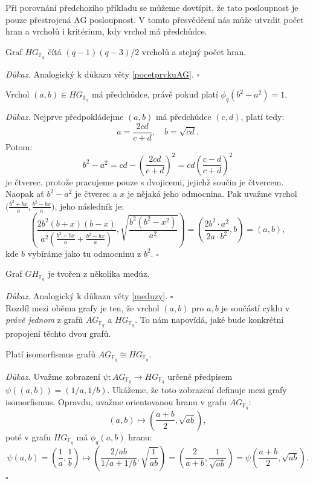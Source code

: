 \documentclass[12pt]{report}
\begin{document}
Při porovnání předchozího příkladu se můžeme dovtípit, že tato posloupnost je pouze přestrojená AG posloupnost. V tomto přesvědčení nás může utvrdit počet hran a vrcholů i kritérium, kdy vrchol má předchůdce.

\begin{veta}
Graf $HG_{\mathbb{F}_q}$ čítá $(q-1)(q-3)/2$ vrcholů a stejný počet hran.
\end{veta}
\textit{Důkaz.} Analogický k důkazu věty \ref{pocetprvkuAG}. \hfill $\square$


\begin{lemma}
Vrchol $(a,b) \in HG_{\mathbb{F}_q}$ má předchůdce, právě pokud platí $\phi_q(b^2-a^2)=1$.
\end{lemma}

\noindent \textit{Důkaz.} Nejprve předpokládejme $(a,b)$ má předchůdce $(c,d)$, platí tedy:
\begin{equation*}
a = \frac{2cd}{c+d}, \quad b = \sqrt{cd}.
\end{equation*}
Potom:
\begin{equation*}
b^2-a^2 = cd- \left(\frac{2 cd}{c+d} \right)^2 = cd \left( \frac{c-d}{c+d} \right)^2
\end{equation*}
je čtverec, protože pracujeme pouze s dvojicemi, jejichž součin je čtvercem. Naopak ať $b^2-a^2$ je čtverec a $x$ je nějaká jeho odmocnina. Pak uvažme vrchol $\Big(\frac{b^2+b  x}{a},\frac{b^2-bx}{a} \Big)$, jeho následník je: $$\left(\frac{2 b^2 (b+x)(b-x)}{a^2 \left(\frac{b^2+bx}{a} + \frac{b^2-bx}{a} \right)}, \sqrt{\frac{b^2(b^2-x^2)}{a^2}} \right)= \left(\frac{2 b^2 \cdot a^2}{2 a \cdot b^2 }, b \right) = \left(a, b \right),$$
kde $b$ vybíráme jako tu  odmocninu z $b^2$. \hfill $\square$

\begin{dusledek}
Graf $GH_{\mathbb{F}_q}$ je tvořen z několika medúz.
\end{dusledek}
\noindent \textit{Důkaz}. Analogický k důkazu věty \ref{meduzy}. \hfill $\square$\\

Rozdíl mezi oběma grafy je ten, že vrchol $(a,b)$ pro $a,b$ je součástí cyklu v \textit{právě jednom} z grafů $AG_{\mathbb{F}_q}$ a $HG_{\mathbb{F}_q}$. To nám napovídá, jaké bude konkrétní propojení těchto dvou grafů.

\begin{veta}
Platí isomorfismus grafů $AG_{\mathbb{F}_q} \cong HG_{\mathbb{F}_q}$.
\end{veta}
\noindent \textit{Důkaz.} Uvažme zobrazení $\psi : AG_{\mathbb{F}_q} \longrightarrow HG_{\mathbb{F}_q}$ určené předpisem $\psi((a,b)) = (1/a,1/b)$. Ukážeme, že toto zobrazení definuje mezi grafy isomorfismus. Opravdu, uvažme orientovanou hranu v grafu $AG_{\mathbb{F}_q}$: 
$$(a,b) \longmapsto \left(\frac{a+b}{2}, \sqrt{ab} \right),$$
poté v grafu $HG_{\mathbb{F}_q}$ má $\phi_q(a,b)$ hranu:
$$\psi (a,b) = \left(\frac{1}{a}, \frac{1}{b} \right) \longmapsto \left(\frac{2/ab}{1/a+1/b}, \sqrt{\frac{1}{ab}} \right) = \left( \frac{2}{a+b}, \frac{1}{\sqrt{ab}} \right) = \psi \left( \frac{a+b}{2}, \sqrt{ab} \right).$$
\hfill $\square$\\
\end{document}
